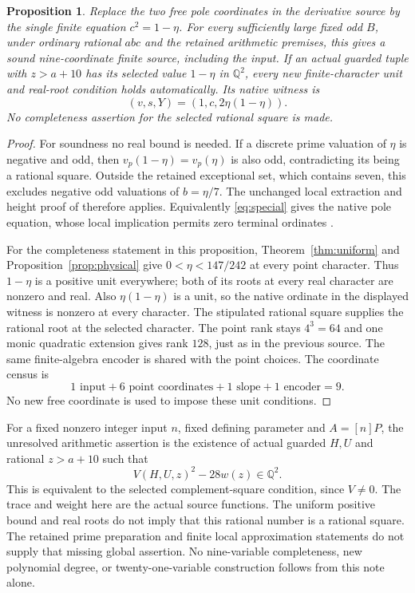 \documentclass[11pt,a4paper]{article}
\newtheorem{proposition}[theorem]{Proposition}
\newcommand{\Q}{\mathbb Q}
\begin{document}
\begin{proposition}\label{prop:finite}
Replace the two free pole coordinates in the derivative source by the
single finite equation $c^2=1-\eta$. For every sufficiently large fixed
odd $B$, under ordinary rational $abc$ and the retained arithmetic
premises, this gives a sound
nine-coordinate finite source, including the input. If an actual
guarded tuple with $z>a+10$ has its selected
value $1-\eta$ in $\Q^2$, every new finite-character unit and real-root
condition holds automatically. Its native witness is
\[
                      (v,s,Y)=(1,c,2\eta(1-\eta)).
\]
No completeness assertion for the selected rational square is made.
\end{proposition}
\begin{proof}
For soundness no real bound is needed. If a discrete prime valuation
of $\eta$ is negative and odd, then
$v_p(1-\eta)=v_p(\eta)$ is also odd, contradicting its being a
rational square. Outside the retained exceptional set, which contains
seven, this excludes negative odd valuations of $b=\eta/7$.
The unchanged local extraction and height proof of \cite{Even}
therefore applies. Equivalently \eqref{eq:special} gives the native
pole equation, whose local implication permits zero terminal ordinates
\cite{Intrinsic}.

For the completeness statement in this proposition,
Theorem~\ref{thm:uniform} and Proposition~\ref{prop:physical} give
$0<\eta<147/242$ at every point character. Thus $1-\eta$ is
a positive unit everywhere; both of its roots at every real character
are nonzero and real. Also $\eta(1-\eta)$ is a unit, so the native
ordinate in the displayed witness is nonzero at every character.
The stipulated rational square supplies the rational root at the
selected character. The point rank stays $4^3=64$ and one monic
quadratic extension gives rank $128$, just as in the previous source.
The same finite-algebra encoder is shared with the point choices.
The coordinate census is
\[
                 1\text{ input}+6\text{ point coordinates}
                    +1\text{ slope}+1\text{ encoder}=9.
\]
No new free coordinate is used to impose these unit conditions.
\end{proof}

For a fixed nonzero integer input $n$, fixed defining parameter and
$A=[n]P$, the unresolved arithmetic assertion is the existence of
actual guarded $H,U$ and rational $z>a+10$ such that
\[
                         V(H,U,z)^2-28w(z)\in\Q^2.
\]
This is equivalent to the selected complement-square condition, since
$V\ne0$. The trace and weight here are the actual source functions.
The uniform positive bound and real roots do not imply that this
rational number is a rational square. The retained prime preparation
and finite local approximation statements do not supply that missing
global assertion. No nine-variable completeness, new polynomial degree,
or twenty-one-variable construction follows from this note alone.
\end{document}
